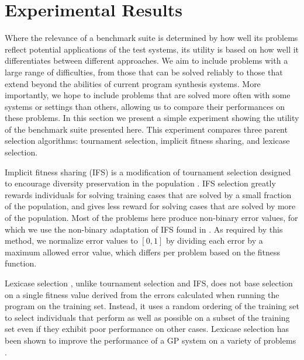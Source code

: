 \documentclass{sig-alternate}
\begin{document}
\section{Experimental Results}

Where the relevance of a benchmark suite is determined by how well its problems reflect potential applications of the test systems, its utility is based on how well it differentiates between different approaches. We aim to include problems with a large range of difficulties, from those that can be solved reliably to those that extend beyond the abilities of current program synthesis systems. More importantly, we hope to include problems that are solved more often with some systems or settings than others, allowing us to compare their performances on these problems.
In this section we present a simple experiment showing the utility of the benchmark suite presented here. This experiment compares three parent selection algorithms: tournament selection, implicit fitness sharing, and lexicase selection.

Implicit fitness sharing (IFS) is a modification of tournament selection designed to encourage diversity preservation in the population \cite{McKay:2000:GECCO}. IFS selection greatly rewards individuals for solving training cases that are solved by a small fraction of the population, and gives less reward for solving cases that are solved by more of the population. Most of the problems here produce non-binary error values, for which we use the non-binary adaptation of IFS found in \cite{Krawiec:2013:EvoIASP}. As required by this method, we normalize error values to $[0, 1]$ by dividing each error by a maximum allowed error value, which differs per problem based on the fitness function.

Lexicase selection \cite{Helmuth:2014:ieeeTEC}, %
 unlike tournament selection and IFS, does not base selection on a single fitness value derived from the errors calculated when running the program on the training set. Instead, it uses a random ordering of the training set to select individuals that perform as well as possible on a subset of the training set even if they exhibit poor performance on other cases. Lexicase selection has been shown to improve the performance of a GP system on a variety of problems \cite{Helmuth:2014:ieeeTEC, Helmuth:2014:GECCO}.
\end{document}
